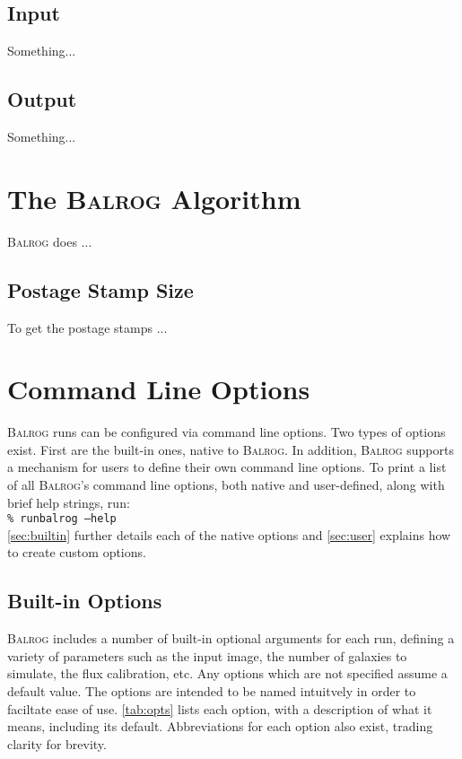 \documentclass[12pt]{article}
\newcommand{\balrog}{\textsc{Balrog}}
\newcommand{\opt}[1]{\texttt{--#1}}
\newcommand{\inset}{\\[0.4cm]}
\newcommand{\bcmd}[1]{\texttt{\% runbalrog #1}}
\begin{document}
\subsection{Input}
\label{sec:input}

Something...

\subsection{Output}
\label{sec:output}

Something...


\section{The \balrog{} Algorithm}
\label{sec:algorithm}

\balrog{} does ...

\subsection{Postage Stamp Size}
\label{sec:postagestamp}

To get the postage stamps ...


\section{Command Line Options}
\balrog{} runs can be configured via command line options.
Two types of options exist. First are the built-in
ones, native to \balrog{}. In addition, \balrog{}
supports a mechanism for users to define their
own command line options.
To print a list of all \balrog{}'s command line options,
both native and user-defined, along with
brief help strings, run:
\inset
\bcmd{\opt{help}}
\inset
\autoref{sec:builtin} further details each
of the native options and \autoref{sec:user}
explains how to create custom options.

\subsection{Built-in Options}
\label{sec:builtin}

\balrog{} includes a number of built-in optional arguments for each run, defining a
variety of parameters such as the input image,
the number of galaxies to simulate, the flux calibration, etc.
Any options which are not specified assume a default value.
The options are intended to be named intuitvely in order
to faciltate ease of use. 
\autoref{tab:opts} lists each option, with a description of 
what it means, including its default.
Abbreviations for each option also exist,
trading clarity for brevity.
\end{document}
